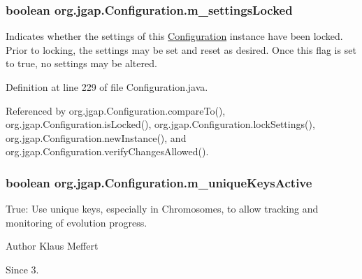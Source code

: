 \hypertarget{classorg_1_1jgap_1_1_configuration_a43fe72f071caf988406e96d35072192a}{
\subsubsection[{m\-\_\-settings\-Locked}]{\setlength{\rightskip}{0pt plus 5cm}boolean org.\-jgap.\-Configuration.\-m\-\_\-settings\-Locked\hspace{0.3cm}{\ttfamily [private]}}}\label{classorg_1_1jgap_1_1_configuration_a43fe72f071caf988406e96d35072192a}
Indicates whether the settings of this \hyperlink{classorg_1_1jgap_1_1_configuration}{Configuration} instance have been locked. Prior to locking, the settings may be set and reset as desired. Once this flag is set to true, no settings may be altered. 

Definition at line 229 of file Configuration.\-java.



Referenced by org.\-jgap.\-Configuration.\-compare\-To(), org.\-jgap.\-Configuration.\-is\-Locked(), org.\-jgap.\-Configuration.\-lock\-Settings(), org.\-jgap.\-Configuration.\-new\-Instance(), and org.\-jgap.\-Configuration.\-verify\-Changes\-Allowed().

\hypertarget{classorg_1_1jgap_1_1_configuration_abfd8c1a4bf558d211afb47e904bac68e}{
\subsubsection[{m\-\_\-unique\-Keys\-Active}]{\setlength{\rightskip}{0pt plus 5cm}boolean org.\-jgap.\-Configuration.\-m\-\_\-unique\-Keys\-Active\hspace{0.3cm}{\ttfamily [private]}}}\label{classorg_1_1jgap_1_1_configuration_abfd8c1a4bf558d211afb47e904bac68e}
True\-: Use unique keys, especially in Chromosomes, to allow tracking and monitoring of evolution progress.

\begin{DoxyAuthor}{Author}
Klaus Meffert 
\end{DoxyAuthor}
\begin{DoxySince}{Since}
3. 
\end{DoxySince}


